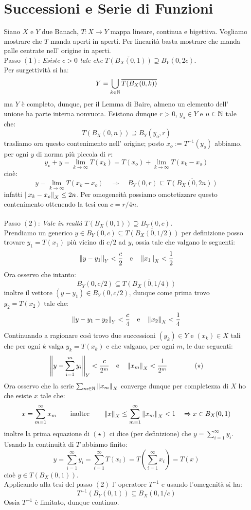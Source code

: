 \section{Successioni e Serie di Funzioni}
 Siano $X$ e $Y$ due Banach, $T:X\rightarrow Y$ mappa lineare, continua e bigettiva. Vogliamo mostrare che $T$ manda aperti in aperti. Per linearità basta mostrare che manda palle centrate nell' origine in aperti.\\
Passo $(1)$: {\it Esiste} $c>0$ {\it tale che} $\overline{T(B_X (0,1))}\supseteq B_Y (0, 2c)$.\\
Per surgettività si ha:
$$
Y=\bigcup_{k\in\mathbb{N}} {\overline{T(B_X (0,k))}}
$$
ma $Y$ è completo, dunque, per il Lemma di Baire, almeno un elemento dell' unione ha parte interna nonvuota. Esistono dunque $r>0$, $y_o\in Y$ e $n\in\mathbb{N}$ tale che:
$$
\overline{T(B_X (0,n))}\supseteq B_Y(y_o,r) 
$$
trasliamo ora questo contenimento nell' origine; posto $x_o:=T^{-1}(y_o)$ abbiamo, per ogni $y$ di norma più piccola di $r$:
$$
y_o+y=\lim_{k\rightarrow \infty} T(x_k)=T(x_o)+ \lim_{k\rightarrow \infty} T(x_k-x_o)
$$
cioè:
$$
y=\lim_{k\rightarrow \infty} T(x_k-x_o)\quad \Rightarrow\quad B_Y(0,r)\subseteq \overline{T(B_X(0,2n))}
$$
infatti $\left \| x_k-x_o \right\|_X\leq 2n$. Per omogeneità possiamo omotetizzare questo contenimento ottenendo la tesi con $c=r/4n$.\\
\\
Passo $(2)$: {\it Vale in realtà} $T(B_X(0,1))\supseteq B_Y(0,c)$.\\
Prendiamo un generico $y\in B_Y(0,c)\subseteq \overline{T(B_X(0,1/2))}$ per definizione posso trovare $y_1=T(x_1)$ più vicino di $c/2$ ad $y$, ossia tale che valgano le seguenti:
$$
\left \| y-y_1 \right\|_Y<\frac{c}{2}\quad \mbox{e}\quad \left \| x_1 \right\|_X<\frac{1}{2}
$$
Ora osservo che intanto:
$$
B_Y(0,c/2)\subseteq \overline{T(B_X(0,1/4))}
$$
inoltre il vettore $(y-y_1)\in B_Y(0,c/2)$, dunque come prima trovo $y_2=T(x_2)$ tale che:
$$
\left \| y-y_1-y_2 \right\|_Y<\frac{c}{4}\quad \mbox{e}\quad \left \| x_2 \right\|_X<\frac{1}{4}
$$
Continuando a ragionare così trovo due successioni $(y_k)\in Y$ e $(x_k)\in X$ tali che per ogni $k$ valga $y_k=T(x_k)$ e che valgano, per ogni $m$, le due seguenti:
$$
\left \| y-\sum_{i=1}^m y_{i} \right\|_Y<\frac{c}{2^m}\quad \mbox{e}\quad \left \| x_m \right\|_X<\frac{1}{2^m}\qquad\qquad (\star)
$$
Ora osservo che la serie $\sum_{m\in\mathbb{N}}\left \| x_m \right\|_X$ converge dunque per completezza di $X$ ho che esiste $x$ tale che:
$$
x=\sum_{m=1}^{\infty} x_m\qquad \mbox{inoltre} \qquad \left \| x \right\|_X\leq\sum_{m=1}^{\infty} \left \| x_m \right\|_X<1\quad \Rightarrow x\in B_X(0,1)
$$
inoltre la prima equazione di $(\star)$ ci dice (per definizione) che $y=\sum_{i=1}^{\infty}y_i$. Usando la continuità di $T$ abbiamo finito:
$$
y=\sum_{i=1}^{\infty}y_i=\sum_{i=1}^{\infty}T(x_i)=T\left(\sum_{i=1}^{\infty}x_i\right)=T(x)
$$
cioè $y\in T(B_X(0,1))$.\\
Applicando alla tesi del passo $(2)$ l' operatore $T^{-1}$ e usando l'omegenità si ha:
$$
T^{-1}(B_Y(0,1))\subseteq B_X(0,1/c)
$$
Ossia $T^{-1}$ è limitato, dunque continuo.
